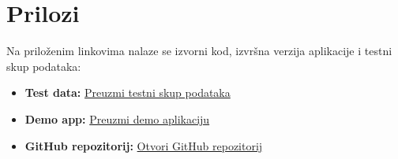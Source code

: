 \documentclass{foi}
\begin{document}
\listoftables
{}

\appendix
\renewcommand{\thechapter}{\arabic{chapter}}

\chapter{Prilozi}

Na priloženim linkovima nalaze se izvorni kod, izvršna verzija aplikacije i testni skup podataka:

\begin{itemize}
    \item \textbf{Test data:} \href{https://drive.google.com/file/d/1HkRVSEx1TenS-NdQvR2hqJcgpEfTY1_9/view?usp=sharing}{Preuzmi testni skup podataka}
    \item \textbf{Demo app:} \href{https://drive.google.com/file/d/1UE2O0IZvvNFToY2gb3TK0EnUSobUZhzJ/view?usp=sharing}{Preuzmi demo aplikaciju}
    \item \textbf{GitHub repozitorij:} \href{https://github.com/Filip1402/GradeVision}{Otvori GitHub repozitorij}
\end{itemize}
\end{document}
